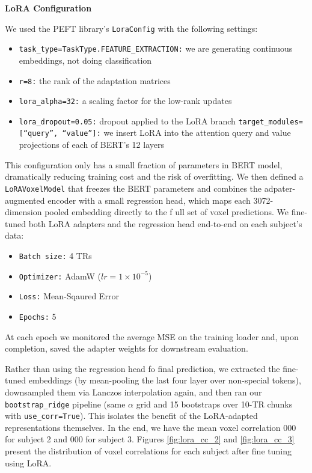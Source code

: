 \documentclass{article}
\begin{document}
\textbf{LoRA Configuration}

We used the PEFT library's \texttt{LoraConfig} with the following settings:
 
\begin{itemize}
    \item \texttt{task\_type=TaskType.FEATURE\_EXTRACTION:} we are generating continuous embeddings, not doing classification
    \item \texttt{r=8:} the rank of the adaptation matrices
    \item \texttt{lora\_alpha=32:} a scaling factor for the low-rank updates
    \item \texttt{lora\_dropout=0.05:} dropout applied to the LoRA branch
    \itm \texttt{target\_modules=[“query”, “value”]:} we insert LoRA into the attention query and value projections of each of BERT’s 12 layers
\end{itemize}
This configuration only has a small fraction of parameters in BERT model, dramatically reducing training cost and the risk of overfitting.  We then defined a \texttt{LoRAVoxelModel} that freezes the BERT parameters and combines the adpater-augmented encoder with a small regression head, which maps each 3072-dimension pooled embedding directly to the f ull set of voxel predictions. We fine-tuned both LoRA adapters and the regression head end-to-end on each subject's data:

\begin{itemize}
    \item \texttt{Batch size:} 4 TRs
    \item \texttt{Optimizer:} AdamW ($lr=1\times10^{-5}$)
    \item \texttt{Loss:} Mean-Sqaured Error
    \item \texttt{Epochs:} 5
\end{itemize}
At each epoch we monitored the average MSE on the training loader and, upon completion, saved the adapter weights for downstream evaluation. 

Rather than using the regression head fo final prediction, we extracted the fine-tuned embeddings (by mean-pooling the last four layer over non-special tokens), downsampled them via Lanczos interpolation again, and then ran our \texttt{bootstrap\_ridge} pipeline (same $\alpha$ grid and 15 bootstraps over 10-TR chunks with \texttt{use\_corr=True}). This isolates the benefit of the LoRA-adapted representations themselves. In the end, we have the mean voxel correlation 000 for subject 2 and 000 for subject 3. Figures \ref{fig:lora_cc_2} and \ref{fig:lora_cc_3} present the distribution of voxel correlations for each subject after fine tuning using LoRA.
\end{document}
